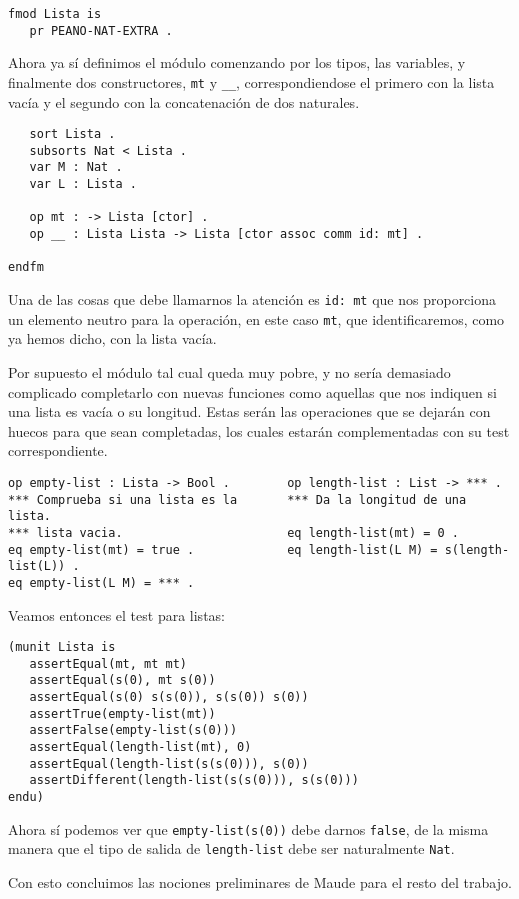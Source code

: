 {\codesize
\begin{verbatim}
fmod Lista is
   pr PEANO-NAT-EXTRA .
\end{verbatim}
}

Ahora ya sí definimos el módulo comenzando por los tipos, las variables, y finalmente dos constructores, \verb"mt" y \verb"__", correspondiendose el primero con la lista vacía y el segundo con la concatenación de dos naturales. \par

{\codesize
\begin{verbatim}
   sort Lista .
   subsorts Nat < Lista .
   var M : Nat .
   var L : Lista .	

   op mt : -> Lista [ctor] .
   op __ : Lista Lista -> Lista [ctor assoc comm id: mt] .

endfm
\end{verbatim}
}

Una de las cosas que debe llamarnos la atención es \verb"id: mt" que nos proporciona un elemento neutro para la operación, en este caso \texttt{mt}, que identificaremos, como ya hemos dicho, con la lista vacía. \par

Por supuesto el módulo tal cual queda muy pobre, y no sería demasiado complicado completarlo con nuevas funciones como aquellas que nos indiquen si una lista es vacía o su longitud. Estas serán las operaciones que  se dejarán con huecos para que sean completadas, los cuales estarán complementadas con su test correspondiente. \par

{\codesize
\begin{verbatim}
op empty-list : Lista -> Bool .        op length-list : List -> *** .
*** Comprueba si una lista es la       *** Da la longitud de una lista.
*** lista vacia.                       eq length-list(mt) = 0 .
eq empty-list(mt) = true .             eq length-list(L M) = s(length-list(L)) .                    
eq empty-list(L M) = *** .                        
\end{verbatim}
}

Veamos entonces el test para listas: \par

\begin{verbatim}
(munit Lista is
   assertEqual(mt, mt mt)
   assertEqual(s(0), mt s(0))
   assertEqual(s(0) s(s(0)), s(s(0)) s(0))
   assertTrue(empty-list(mt))
   assertFalse(empty-list(s(0)))
   assertEqual(length-list(mt), 0)
   assertEqual(length-list(s(s(0))), s(0))
   assertDifferent(length-list(s(s(0))), s(s(0)))
endu)
\end{verbatim}

Ahora sí podemos ver que \verb"empty-list(s(0))" debe darnos \texttt{false}, de la misma manera que el tipo de salida de \verb"length-list" debe ser naturalmente \texttt{Nat}.\par 

Con esto concluimos las nociones preliminares de Maude para el resto del trabajo.\par 

